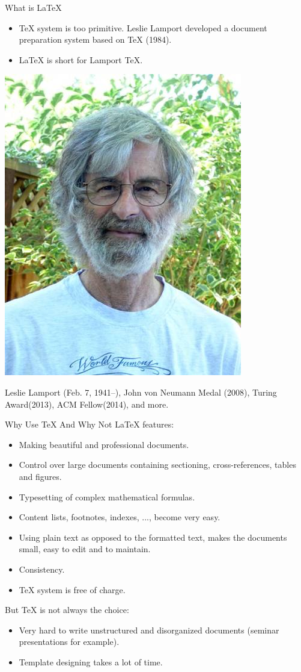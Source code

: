\documentclass[10pt]{beamer}
\begin{document}
\begin{frame}{What is \LaTeX}
\begin{itemize}
    \item \TeX{} system is too primitive. Leslie Lamport developed a document
    preparation system based on \TeX{} (1984).

\item \LaTeX{} is short for \alert{La}mport \alert{TeX{}}.
\end{itemize}
\begin{center}
    \includegraphics[width=.4\textwidth]{Leslie-Lamport.jpg}
\end{center}
    Leslie Lamport (Feb. 7, 1941--),
    John von Neumann Medal (2008),
    Turing Award(2013), ACM Fellow(2014), and more.
\end{frame}

\begin{frame}{Why Use \TeX{} And Why Not}
\LaTeX{} features:
\begin{itemize}
    \item Making beautiful and professional documents.
    \item Control over large documents containing sectioning,
        cross-references, tables and figures.
    \item Typesetting of complex mathematical formulas.
    \item Content lists, footnotes, indexes, ..., become very easy.
    \item Using plain text as opposed to the formatted text, 
        makes the documents small, easy to edit and to maintain.
    \item Consistency.
    \item \TeX{} system is free of charge.
\end{itemize}

    But \TeX{} is not always the choice:
\begin{itemize}
    \item Very hard to write unstructured and disorganized documents
        (seminar presentations for example).
    \item Template designing takes a lot of time.
\end{itemize}
\end{frame}
\end{document}
